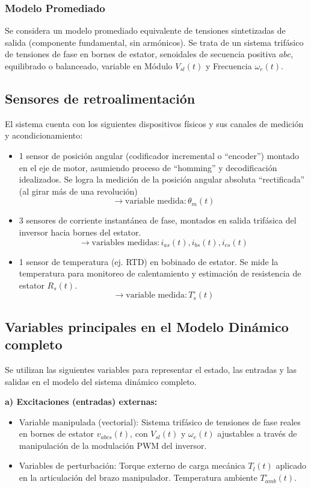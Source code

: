 \documentclass[a4paper, 10pt, onecolumn,journal]{ieeeconf}
\begin{document}
\subsubsection{\textbf{Modelo Promediado}}
Se considera un modelo promediado equivalente de tensiones sintetizadas de salida (componente fundamental, sin armónicos). Se trata de un sistema trifásico de tensiones de fase en bornes de estator, senoidales de secuencia positiva $abc$, equilibrado o balanceado, variable en Módulo $V_{sl}(t)$ y Frecuencia $\omega_e(t)$.

\subsection{\textbf{Sensores de retroalimentación}}

El sistema cuenta con los siguientes dispositivos físicos y sus canales de medición y acondicionamiento:
\begin{itemize}
    \item 1 sensor de posición angular (codificador incremental o “encoder”) montado en el eje de motor, asumiendo proceso de “homming” y decodificación idealizados. Se logra la medición de la posición angular absoluta “rectificada” (al girar más de una revolución)
    \[\rightarrow \text{variable medida}: \theta_m(t)\]
    \item 3 sensores de corriente instantánea de fase, montados en salida trifásica del inversor hacia bornes del estator.
    \[\rightarrow \text{variables medidas}: i_{as}(t), i_{bs}(t), i_{cs}(t)\]
    \item 1 sensor de temperatura (ej. RTD) en bobinado de estator. Se mide la temperatura para monitoreo de calentamiento y estimación de resistencia de estator $R_s(t)$.
    \[\rightarrow \text{variable medida}: T_s^{\circ}(t)\]
\end{itemize}

\subsection{\textbf{Variables principales en el Modelo Dinámico completo}}
Se utilizan las siguientes variables para representar el estado, las entradas y las salidas en el modelo del sistema dinámico completo.

\textbf{a) Excitaciones (entradas) externas:}
\begin{itemize}
    \item Variable manipulada (vectorial): Sistema trifásico de tensiones de fase reales en bornes de estator $v_{abcs}(t)$, con $V_{sl}(t)$ y $\omega_e(t)$ ajustables a través de manipulación de la modulación PWM del inversor.
    \item Variables de perturbación: Torque externo de carga mecánica $T_l(t)$ aplicado en la articulación del brazo manipulador. Temperatura ambiente $T_{amb}^{\circ}(t)$.
\end{itemize}
\end{document}
